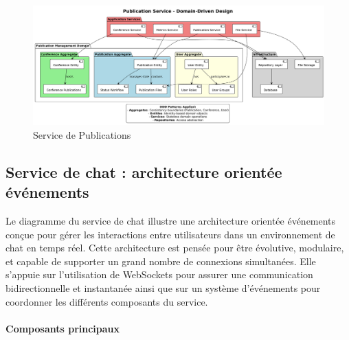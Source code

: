 \documentclass{rapportPfe}
\begin{document}
\begin{figure}[htbp]
    \centering
    \includegraphics[width=1.1\textwidth]{diagrams/diagram3.png}
    \caption{Service de Publications }
    \label{fig:diagram3}
\end{figure}

\FloatBarrier
\subsection{Service de chat : architecture orientée événements }

Le diagramme du service de chat illustre une architecture orientée événements conçue pour gérer les interactions entre utilisateurs dans un environnement de chat en temps réel. Cette architecture est pensée pour être évolutive, modulaire, et capable de supporter un grand nombre de connexions simultanées. Elle s’appuie sur l’utilisation de WebSockets pour assurer une communication bidirectionnelle et instantanée ainsi que sur un système d’événements pour coordonner les différents composants du service.

\paragraph{Composants principaux}
\end{document}
